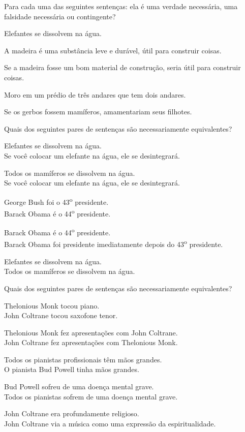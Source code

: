 \problempart
Para cada uma das seguintes sentenças: ela é uma verdade necessária, uma falsidade necessária ou contingente?
\begin{compactlist}
\item Elefantes se dissolvem na água.
\item A madeira é uma substância leve e durável, útil para construir coisas.
\item Se a madeira fosse um bom material de construção, seria útil para construir coisas.
\item Moro em um prédio de três andares que tem dois andares.
\item Se os gerbos fossem mamíferos, amamentariam seus filhotes.
\end{compactlist}

\problempart Quais dos seguintes pares de sentenças são necessariamente equivalentes? 

\begin{compactlist}
\item Elefantes se dissolvem na água.	\\
	Se você colocar um elefante na água, ele se desintegrará.
\item Todos os mamíferos se dissolvem na água.\\		
	Se você colocar um elefante na água, ele se desintegrará.
\item George Bush foi o 43\textsuperscript{o} presidente. \\
	 Barack Obama é o 44\textsuperscript{o} presidente.
\item Barack Obama é o 44\textsuperscript{o} presidente. \\
	  Barack Obama foi presidente imediatamente depois do 43\textsuperscript{o} presidente.
\item Elefantes se dissolvem na água. 	\\	
	Todos os mamíferos se dissolvem na água.
\end{compactlist}
\problempart Quais dos seguintes pares de sentenças são necessariamente equivalentes? 

\begin{compactlist}
\item Thelonious Monk tocou piano.	\\
	John Coltrane tocou saxofone tenor.
\item Thelonious Monk fez apresentações com John Coltrane.	\\
	John Coltrane fez apresentações com Thelonious Monk.
\item Todos os pianistas profissionais têm mãos grandes.	\\
	O pianista Bud Powell tinha mãos grandes.
\item Bud Powell sofreu de uma doença mental grave.	 \\
	Todos os pianistas sofrem de uma doença mental grave.
\item John Coltrane era profundamente religioso.	 \\
John Coltrane via a música como uma expressão da espiritualidade.
\end{compactlist}

